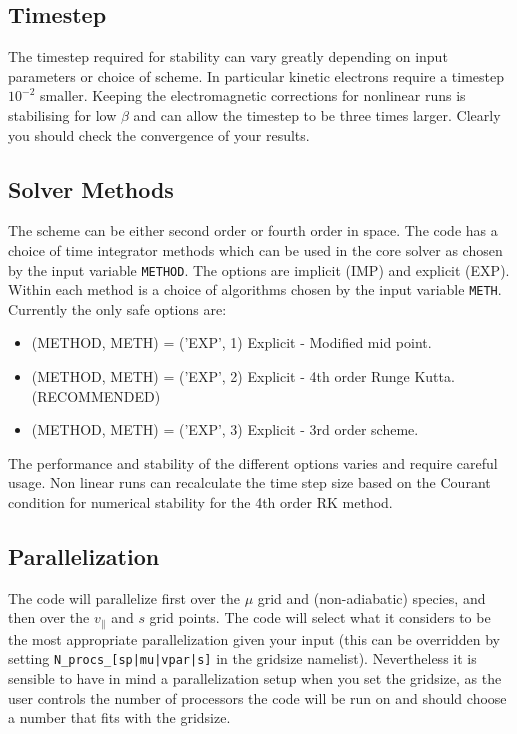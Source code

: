 \documentclass{report}
\begin{document}
\subsection{Timestep}
The timestep required for stability can vary greatly depending on input parameters or choice of scheme.  In particular kinetic electrons require a timestep $10^{-2}$ smaller.  Keeping the electromagnetic corrections for nonlinear runs is stabilising for low $\beta$ and can allow the timestep to be three times larger.  Clearly you should check the convergence of your results.

\subsection{Solver Methods}
The scheme can be either second order or fourth order in space.  The code has a choice of time integrator methods which can be used in the core solver as chosen by the input variable \texttt{METHOD}. The options are implicit (IMP) and explicit (EXP).  Within each method is a choice of algorithms chosen by the input variable \texttt{METH}. Currently the only safe options are:

\begin{itemize}
\item (METHOD, METH) = ('EXP', 1) Explicit - Modified mid point.
\item (METHOD, METH) = ('EXP', 2) Explicit - 4th order Runge Kutta.(RECOMMENDED)
\item (METHOD, METH) = ('EXP', 3) Explicit - 3rd order scheme.
\end{itemize}

The performance and stability of the different options varies and require careful usage.  Non linear runs can recalculate the time step size based on the Courant condition for numerical stability for the 4th order RK method.

\subsection{Parallelization}
The code will parallelize first over the $\mu$ grid and (non-adiabatic) species, and then over the $v_{\parallel}$ and $s$ grid points.  The code will select what it considers to be the most appropriate parallelization given your input (this can be overridden by setting \texttt{N\_procs\_[sp|mu|vpar|s]} in the gridsize namelist).  Nevertheless it is sensible to have in mind a parallelization setup when you set the gridsize, as the user controls the number of processors the code will be run on and should choose a number that fits with the gridsize.
\end{document}
